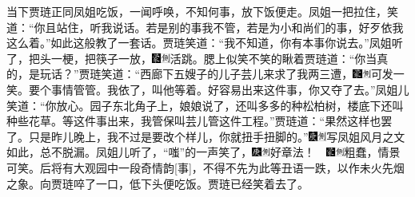 当下贾琏正同凤姐吃饭，一闻呼唤，不知何事，放下饭便走。凤姐一把拉住，笑道：``你且站住，听我说话。若是别的事我不管，若是为小和尚们的事，好歹依我这么着。''如此这般教了一套话。贾琏笑道：``我不知道，你有本事你说去。''凤姐听了，把头一梗，把筷子一放，{\includegraphics[width=3mm]{../Images/00006}\includegraphics[width=3mm]{../Images/00011}\footnotesize \kaishu 活跳。}腮上似笑不笑的瞅着贾琏道：``你当真的，是玩话？''贾琏笑道：``西廊下五嫂子的儿子芸儿来求了我两三遭，{\includegraphics[width=3mm]{../Images/00006}\includegraphics[width=3mm]{../Images/00011}\footnotesize \kaishu 可发一笑。}要个事情管管。我依了，叫他等着。好容易出来这件事，你又夺了去。''凤姐儿笑道：``你放心。园子东北角子上，娘娘说了，还叫多多的种松柏树，楼底下还叫种些花草。等这件事出来，我管保叫芸儿管这件工程。''贾琏道：``果然这样也罢了。只是昨儿晚上，我不过是要改个样儿，你就扭手扭脚的。''{\includegraphics[width=3mm]{../Images/00004}\includegraphics[width=3mm]{../Images/00011}\footnotesize \kaishu 写凤姐风月之文如此，总不脱漏。}凤姐儿听了，``嗤''的一声笑了，{{\includegraphics[width=3mm]{../Images/00004}\includegraphics[width=3mm]{../Images/00011}\footnotesize \kaishu 好章法！　}\includegraphics[width=3mm]{../Images/00006}\includegraphics[width=3mm]{../Images/00011}\footnotesize \kaishu 粗蠢，情景可笑。后将有大观园中一段奇情韵{[}事{]}，不得不先为此等丑语一跌，以作未火先烟之象。}向贾琏啐了一口，低下头便吃饭。贾琏已经笑着去了。

